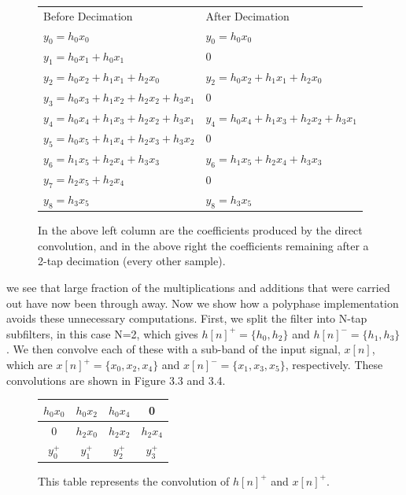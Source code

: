 \documentclass{report}
\begin{document}
\begin{figure}[ht]
\begin{center}
  \begin{tabular}{ l|l }
    \hline
    Before Decimation & After Decimation\\ \Xhline{1pt}
	$y_0 = h_0 x_0$ & $y_0 = h_0 x_0$\\ \hline
	$y_1 = h_0 x_1 + h_0 x_1$ & 0\\ \hline 
	$y_2 = h_0 x_2 + h_1 x_1 + h_2 x_0$ & $y_2 = h_0 x_2 + h_1 x_1 + h_2 x_0$\\ \hline 
	$y_3 = h_0 x_3 + h_1 x_2+ h_2 x_2 + h_3 x_1$ & 0 \\ \hline 
	$y_4 = h_0 x_4 + h_1 x_3+ h_2 x_2 + h_3 x_1$ & $y_4 = h_0 x_4 + h_1 x_3+ h_2 x_2 +     	h_3 x_1$\\ \hline
	$y_5 = h_0 x_5 + h_1 x_4 + h_2 x_3 + h_3 x_2$ & 0\\ \hline
	$y_6 = h_1 x_5 + h_2 x_4 + h_3 x_3$ & $y_6 = h_1 x_5 + h_2 x_4 + h_3 x_3$\\ \hline
	$y_7 = h_2 x_5 + h_2 x_4$ & 0\\ \hline
	$y_8 = h_3 x_5$ & $y_8 = h_3 x_5$\\ \hline
  \end{tabular}
\end{center}
\caption{In the above left column are the coefficients produced by the direct convolution, and in the above right the coefficients remaining after a 2-tap decimation (every other sample).}
\end{figure}

we see that large fraction of the multiplications and additions that were carried out have now been through away.  Now we show how a polyphase implementation avoids these unnecessary computations.  First, we split the filter into N-tap subfilters, in this case N=2, which gives $h[n]^+ = \{h_0, h_2\}$ and $h[n]^- = \{h_1, h_3\}$.  We then convolve each of these with a sub-band of the input signal, $x[n]$, which are $x[n]^+ = \{x_0, x_2, x_4\}$ and $x[n]^- = \{x_1, x_3, x_5\}$, respectively.  These convolutions are shown in Figure 3.3 and 3.4.

\smallskip
\begin{figure}[ht]
\begin{center}
  \begin{tabular}{ c|c|c|c }
	\hline
	$h_0 x_0$ & $h_0 x_2$ &$h_0 x_4$&0\\ \hline
	0 & $h_2 x_0$ & $h_2 x_2$ &$h_2 x_4$\\ \Xhline{1pt}
	$y^+_0$ & $y^+_1$ & $y^+_2$ & $y^+_3$\\ \hline
  \end{tabular}
\end{center}
\caption{This table represents the convolution of $h[n]^+$ and $x[n]^+$.}
\end{figure}
\end{document}
